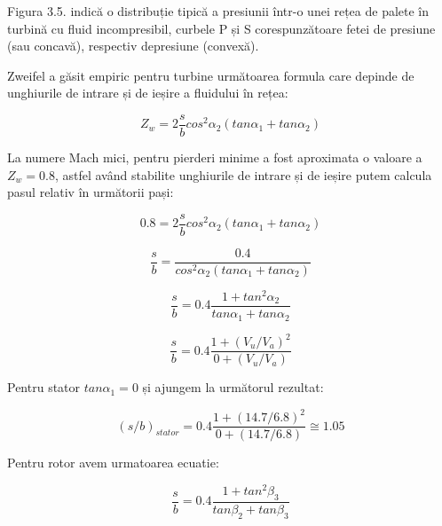 Figura 3.5. indică o distribuție tipică a presiunii într-o unei rețea de palete în turbină cu fluid incompresibil, curbele P și S corespunzătoare fetei de presiune (sau concavă), respectiv depresiune (convexă).

Zweifel a găsit empiric pentru turbine următoarea formula care depinde de unghiurile de intrare și de ieșire a fluidului în rețea:

\begin{equation}
Z_w = 2 \frac{s}{b} cos^2\alpha_2 (tan\alpha_1 + tan\alpha_2)
\end{equation}

La numere Mach mici, pentru pierderi minime a fost aproximata o valoare a $Z_w = 0.8$, astfel având stabilite unghiurile de intrare și de ieșire putem calcula pasul relativ în următorii pași:

\begin{equation}
0.8 = 2 \frac{s}{b} cos^2\alpha_2 (tan\alpha_1 + tan\alpha_2)
\end{equation}

\begin{equation}
\frac{s}{b} = \frac{0.4}{cos^2\alpha_2 (tan\alpha_1 + tan\alpha_2)}
\end{equation}

\begin{equation}
\frac{s}{b} = 0.4 \frac{1+tan^2\alpha_2}{tan\alpha_1 + tan\alpha_2}
\end{equation}

\begin{equation}
\frac{s}{b} = 0.4 \frac{1 + (V_u / V_a)^2 } {0 + (V_u / V_a)}
\end{equation}

\vspace{5mm} %

Pentru stator $tan\alpha_1 = 0$ și ajungem la următorul rezultat:

\begin{equation}
(s/b)_{stator} = 0.4 \frac{1 + (14.7 / 6.8)^2 } {0 + (14.7 / 6.8)}\cong 1.05
\end{equation}

\vspace{5mm} %

Pentru rotor avem urmatoarea ecuatie:

\begin{equation}
\frac{s}{b} = 0.4 \frac{1+tan^2\beta_3}{tan\beta_2 + tan\beta_3}
\end{equation}

